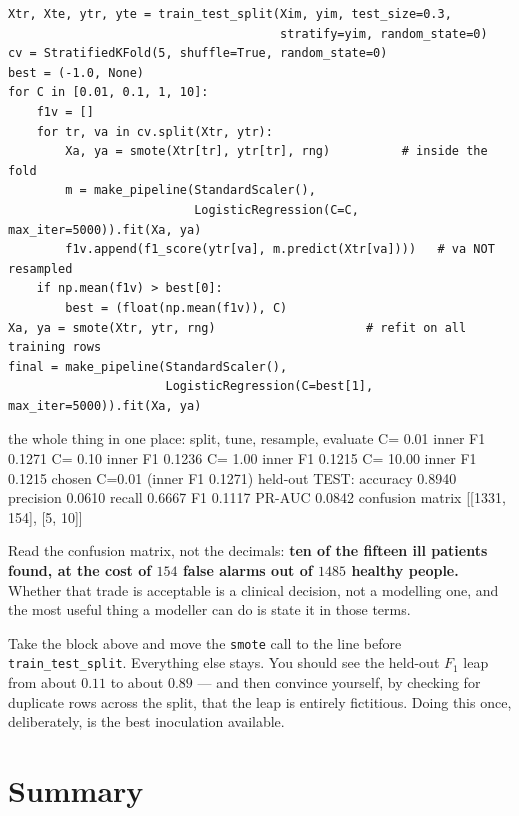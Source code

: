 \documentclass[11pt]{article}
\begin{document}
\begin{lstlisting}
Xtr, Xte, ytr, yte = train_test_split(Xim, yim, test_size=0.3,
                                      stratify=yim, random_state=0)
cv = StratifiedKFold(5, shuffle=True, random_state=0)
best = (-1.0, None)
for C in [0.01, 0.1, 1, 10]:
    f1v = []
    for tr, va in cv.split(Xtr, ytr):
        Xa, ya = smote(Xtr[tr], ytr[tr], rng)          # inside the fold
        m = make_pipeline(StandardScaler(),
                          LogisticRegression(C=C, max_iter=5000)).fit(Xa, ya)
        f1v.append(f1_score(ytr[va], m.predict(Xtr[va])))   # va NOT resampled
    if np.mean(f1v) > best[0]:
        best = (float(np.mean(f1v)), C)
Xa, ya = smote(Xtr, ytr, rng)                     # refit on all training rows
final = make_pipeline(StandardScaler(),
                      LogisticRegression(C=best[1], max_iter=5000)).fit(Xa, ya)
\end{lstlisting}
\begin{codeout}
the whole thing in one place: split, tune, resample, evaluate
      C=  0.01  inner F1 0.1271
      C=  0.10  inner F1 0.1236
      C=  1.00  inner F1 0.1215
      C= 10.00  inner F1 0.1215
   chosen C=0.01 (inner F1 0.1271)
   held-out TEST: accuracy 0.8940  precision 0.0610  recall 0.6667  F1 0.1117  PR-AUC 0.0842
   confusion matrix [[1331, 154], [5, 10]]
\end{codeout}

Read the confusion matrix, not the decimals: \textbf{ten of the fifteen ill
patients found, at the cost of $154$ false alarms out of $1485$ healthy
people.} Whether that trade is acceptable is a clinical decision, not a
modelling one, and the most useful thing a modeller can do is state it in
those terms.

\begin{tryit}
Take the block above and move the \texttt{smote} call to the line before
\texttt{train\_test\_split}. Everything else stays. You should see the held-out
$F_1$ leap from about $0.11$ to about $0.89$ --- and then convince yourself, by
checking for duplicate rows across the split, that the leap is entirely
fictitious. Doing this once, deliberately, is the best inoculation available.
\end{tryit}

\section{Summary}
\label{sec:summary}
\end{document}
